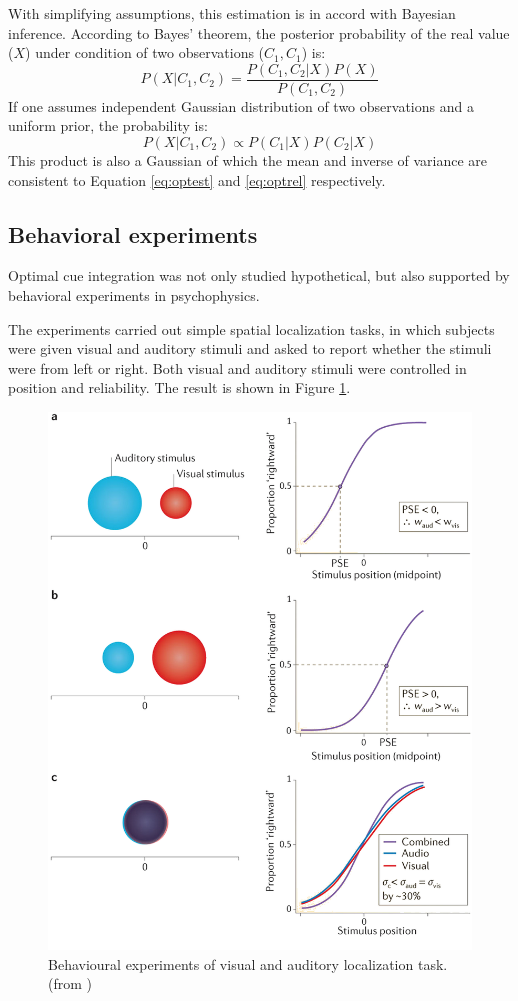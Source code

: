 \documentclass{article}[11pt]
\begin{document}
With simplifying assumptions, this estimation is in accord with Bayesian inference\cite{knill_bayesian_2004}. According to Bayes' theorem, the posterior probability of the real value ($X$) under condition of two observations ($C_1, C_1$) is:
\begin{equation}
  P(X|C_1,C_2) = \frac{P(C_1,C_2|X)P(X)}{P(C_1,C_2)}
\end{equation}
If one assumes independent Gaussian distribution of two observations and a uniform prior, the probability is:
\begin{equation}
  P(X|C_1,C_2) \propto P(C_1|X)P(C_2|X)
\end{equation}
This product is also a Gaussian of which the mean and inverse of variance are consistent to Equation \ref{eq:optest} and \ref{eq:optrel} respectively.

\subsection{Behavioral experiments}
Optimal cue integration was not only studied hypothetical, but also supported by behavioral experiments in psychophysics\cite{alais_ventriloquist_2004}.

The experiments carried out simple spatial localization tasks, in which subjects were given visual and auditory stimuli and asked to report whether the stimuli were from left or right. Both visual and auditory stimuli were controlled in position and reliability. The result is shown in Figure \ref{fig:visaudloc}.

\begin{figure}[htpb]
  \centering
  \includegraphics[width=.9\textwidth]{fetsch-visaudloc}
  \caption{Behavioural experiments of visual and auditory localization task. (from \cite{fetsch_bridging_2013})}
  \label{fig:visaudloc}
\end{figure}
\end{document}
